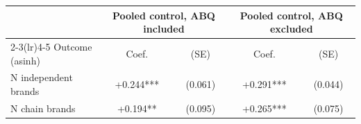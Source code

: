\begin{tabular}{@{}lcccc@{}}
\toprule
 & \multicolumn{2}{c}{Pooled control, ABQ included} & \multicolumn{2}{c}{Pooled control, ABQ excluded} \\
\cmidrule(lr){2-3}\cmidrule(lr){4-5}
Outcome (asinh) & Coef. & (SE) & Coef. & (SE) \\
\midrule
N independent brands & +0.244*** & (0.061) & +0.291*** & (0.044) \\
N chain brands & +0.194** & (0.095) & +0.265*** & (0.075) \\
\bottomrule
\end{tabular}
